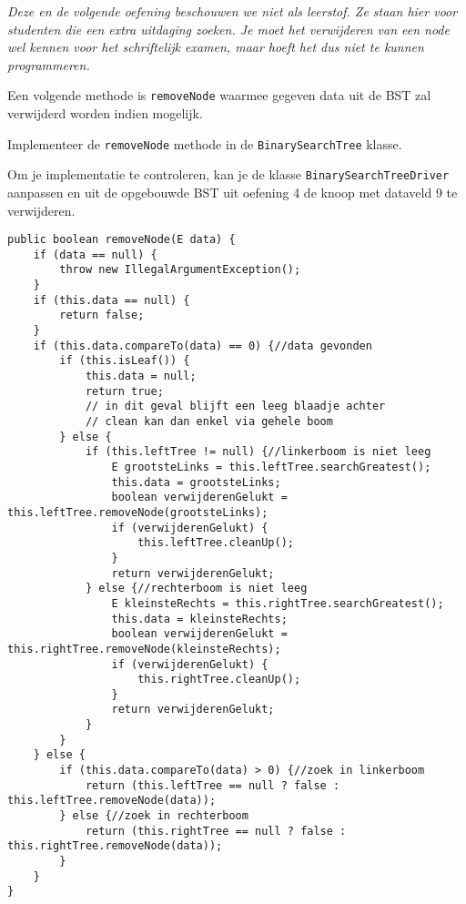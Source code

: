 \begin{oef}
\code \emph{Deze en de volgende oefening beschouwen we niet als leerstof. Ze staan hier voor studenten die een extra uitdaging zoeken. Je moet het verwijderen van een node wel kennen voor het schriftelijk examen, maar hoeft het dus niet te kunnen programmeren.}

Een volgende methode is \verb=removeNode= waarmee gegeven data uit de BST zal verwijderd worden indien mogelijk. 
\begin{oefenumerate}
\item Implementeer de \verb=removeNode= methode in de \verb=BinarySearchTree= klasse. 
\item Om je implementatie te controleren, kan je de klasse  \verb=BinarySearchTreeDriver= aanpassen en uit de opgebouwde BST uit oefening 4 de knoop met dataveld 9 te verwijderen.

	
	
\end{oefenumerate}
\begin{opl}
\begin{lstlisting}[caption={removeNode methode}, label=bstremovenode]
public boolean removeNode(E data) {
	if (data == null) {
		throw new IllegalArgumentException();
	}
	if (this.data == null) {
		return false;
	}
	if (this.data.compareTo(data) == 0) {//data gevonden
		if (this.isLeaf()) {
			this.data = null;
			return true;
			// in dit geval blijft een leeg blaadje achter
			// clean kan dan enkel via gehele boom
		} else {
			if (this.leftTree != null) {//linkerboom is niet leeg
				E grootsteLinks = this.leftTree.searchGreatest();
				this.data = grootsteLinks;
				boolean verwijderenGelukt = this.leftTree.removeNode(grootsteLinks);
				if (verwijderenGelukt) {
					this.leftTree.cleanUp();
				}
				return verwijderenGelukt;
			} else {//rechterboom is niet leeg
				E kleinsteRechts = this.rightTree.searchGreatest();
				this.data = kleinsteRechts;
				boolean verwijderenGelukt = this.rightTree.removeNode(kleinsteRechts);
				if (verwijderenGelukt) {
					this.rightTree.cleanUp();
				}
				return verwijderenGelukt;
			}
		}
	} else {
		if (this.data.compareTo(data) > 0) {//zoek in linkerboom
			return (this.leftTree == null ? false : this.leftTree.removeNode(data));
		} else {//zoek in rechterboom
			return (this.rightTree == null ? false : this.rightTree.removeNode(data));
		}
	}
}
\end{lstlisting}


\end{opl}
\end{oef}
